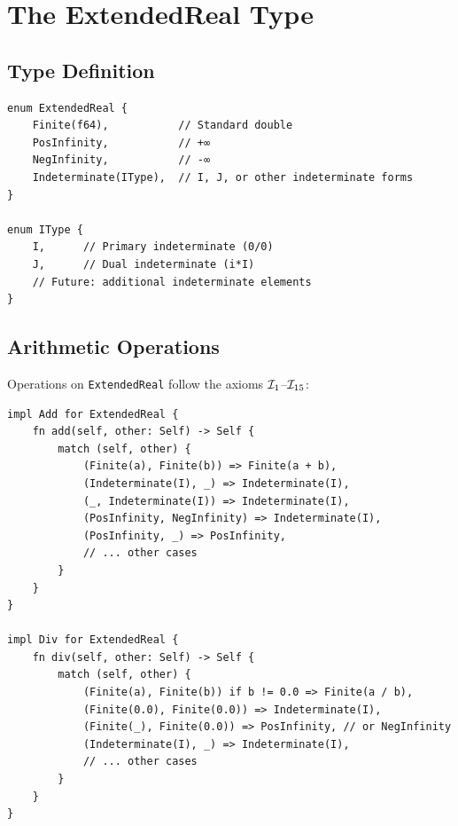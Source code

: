 \section{The ExtendedReal Type}

\subsection{Type Definition}

\begin{definition}[ExtendedReal]
\begin{verbatim}
enum ExtendedReal {
    Finite(f64),           // Standard double
    PosInfinity,           // +∞
    NegInfinity,           // -∞
    Indeterminate(IType),  // I, J, or other indeterminate forms
}

enum IType {
    I,      // Primary indeterminate (0/0)
    J,      // Dual indeterminate (i*I)
    // Future: additional indeterminate elements
}
\end{verbatim}
\end{definition}

\subsection{Arithmetic Operations}

\begin{definition}
Operations on \texttt{ExtendedReal} follow the axioms $\mathcal{I}_1$--$\mathcal{I}_{15}$:

\begin{verbatim}
impl Add for ExtendedReal {
    fn add(self, other: Self) -> Self {
        match (self, other) {
            (Finite(a), Finite(b)) => Finite(a + b),
            (Indeterminate(I), _) => Indeterminate(I),
            (_, Indeterminate(I)) => Indeterminate(I),
            (PosInfinity, NegInfinity) => Indeterminate(I),
            (PosInfinity, _) => PosInfinity,
            // ... other cases
        }
    }
}

impl Div for ExtendedReal {
    fn div(self, other: Self) -> Self {
        match (self, other) {
            (Finite(a), Finite(b)) if b != 0.0 => Finite(a / b),
            (Finite(0.0), Finite(0.0)) => Indeterminate(I),
            (Finite(_), Finite(0.0)) => PosInfinity, // or NegInfinity
            (Indeterminate(I), _) => Indeterminate(I),
            // ... other cases
        }
    }
}
\end{verbatim}
\end{definition}


